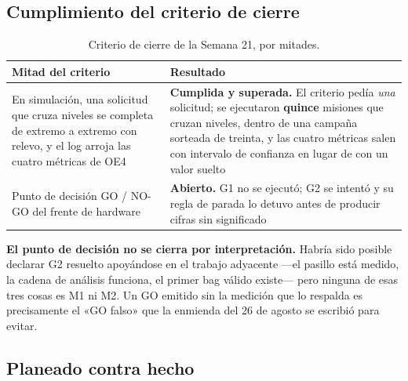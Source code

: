 \documentclass[12pt,letterpaper]{article}
\begin{document}
\subsection{Cumplimiento del criterio de cierre}

\begin{table}[H]
    \centering
    \small
    \caption{Criterio de cierre de la Semana 21, por mitades.}
    \label{tab:cierre}
    \begin{tabular}{@{}p{6.6cm}p{6.6cm}@{}}
        \toprule
        \textbf{Mitad del criterio} & \textbf{Resultado} \\ \midrule
        En simulación, una solicitud que cruza niveles se completa de extremo a extremo con relevo, y el log arroja las cuatro métricas de OE4 & \textbf{Cumplida y superada.} El criterio pedía \emph{una} solicitud; se ejecutaron \textbf{quince} misiones que cruzan niveles, dentro de una campaña sorteada de treinta, y las cuatro métricas salen con intervalo de confianza en lugar de con un valor suelto \\ \addlinespace
        Punto de decisión GO / NO-GO del frente de hardware & \textbf{Abierto.} G1 no se ejecutó; G2 se intentó y su regla de parada lo detuvo antes de producir cifras sin significado \\ \bottomrule
    \end{tabular}
\end{table}

\textbf{El punto de decisión no se cierra por interpretación.} Habría sido posible declarar G2 resuelto apoyándose en el trabajo adyacente ---el pasillo está medido, la cadena de análisis funciona, el primer bag válido existe--- pero ninguna de esas tres cosas es M1 ni M2. Un GO emitido sin la medición que lo respalda es precisamente el «GO falso» que la enmienda del 26 de agosto se escribió para evitar.

\subsection{Planeado contra hecho}
\end{document}
